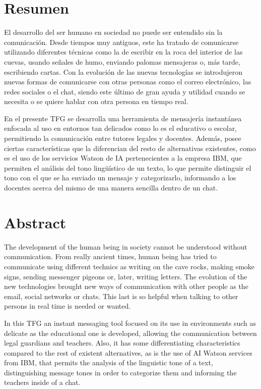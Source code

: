 \chapter{Resumen}
El desarrollo del ser humano en sociedad no puede ser entendido sin la comunicación. Desde tiempos muy antiguos, este ha tratado de comunicarse utilizando diferentes técnicas como la de escribir en la roca del interior de las cuevas, usando señales de humo, enviando palomas mensajeras o, más tarde, escribiendo cartas. Con la evolución de las nuevas tecnologías se introdujeron nuevas formas de comunicarse con otras personas como el correo electrónico, las redes sociales o el chat, siendo este último de gran ayuda y utilidad cuando se necesita o se quiere hablar con otra persona en tiempo real.

En el presente \acf{TFG} se desarrolla una herramienta de mensajería instantánea enfocada al uso en entornos tan delicados como lo es el educativo o escolar, permitiendo la comunicación entre tutores legales y docentes. Además, posee ciertas características que la diferencian del resto de alternativas existentes, como es el uso de los servicios Watson de \acf{IA} pertenecientes a la empresa IBM, que permiten el análisis del tono lingüístico de un texto, lo que permite distinguir el tono con el que se ha enviado un mensaje y categorizarlo, informando a los docentes acerca del mismo de una manera sencilla dentro de un chat.


\chapter{Abstract}

The development of the human being in society cannot be understood without communication. From really ancient times, human being has tried to communicate using different technics as writing on the cave rocks, making smoke signs, sending messenger pigeons or, later, writing letters. The evolution of the new technologies brought new ways of communication with other people as the email, social networks or chats. This last is so helpful when talking to other persons in real time is needed or wanted.

In this \acs{TFG} an instant messaging tool focused on its use in environments such as delicate as the educational one is developed, allowing the communication between legal guardians and teachers. Also, it has some differentiating characteristics compared to the rest of existent alternatives, as is the use of AI Watson services from IBM, that permits the analysis of the linguistic tone of a text, distinguishing message tones in order to categorize them and informing the teachers inside of a chat.
